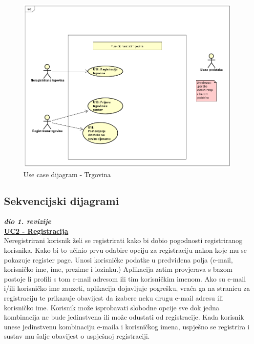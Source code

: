 			\begin{figure}[H]
			\includegraphics[width=\textwidth]{slike/Trgovina.PNG} %
			\caption{Use case dijagram - Trgovina}
			\label{fig:Trgovina} %
			\end{figure}
				\eject		
				
			\subsection{Sekvencijski dijagrami}
				
				\textbf{\textit{dio 1. revizije}}\\
				
				\underline{\textbf{UC2 - Registracija}}\\
				
				Neregistrirani korisnik želi se registrirati kako bi dobio pogodnosti registriranog korisnika. Kako bi to učinio prvu odabire opciju za registraciju nakon koje mu se pokazuje register page. Unosi korisničke podatke u predviđena polja (e-mail, korisničko ime, ime, prezime i lozinku.) Aplikacija zatim provjerava s bazom postoje li profili s tom e-mail adresom ili tim korisničkim imenom. Ako su e-mail i/ili korisničko ime zauzeti, aplikacija dojavljuje pogrešku, vraća ga na stranicu za registraciju te prikazuje obavijest da izabere neku drugu e-mail adresu ili korisničko ime. Korisnik može isprobavati slobodne opcije sve dok jedna kombinacija ne bude jedinstvena ili može odustati od registracije. Kada korisnik unese jedinstvenu kombinaciju e-maila i korisničkog imena, uspješno se registrira i sustav mu šalje obavijest o uspješnoj registraciji.
				
